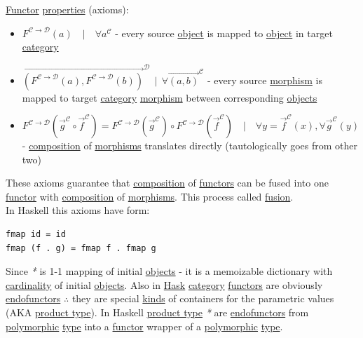\documentclass[a4paper,14pt,oneside]{book}
\begin{document}
\hyperref[orge5e236e]{Functor} \hyperref[org1feb373]{properties} (axioms):\\
\begin{itemize}
\item \(F^{\mathcal{C \to D}}(a) \quad | \quad \forall a^{\mathcal{C}}\) - every source \hyperref[org5771609]{object} is mapped to \hyperref[org5771609]{object} in target \hyperref[org841d8bc]{category}\\
\item \(\overrightarrow{(F^{\mathcal{C \to D}}(a),F^{\mathcal{C \to D}}(b))}^{\mathcal{D}} \ \ | \ \ \forall \overrightarrow{(a, b)}^{\mathcal{C}}\) - every source \hyperref[org2170e98]{morphism} is mapped to target \hyperref[org841d8bc]{category} \hyperref[org2170e98]{morphism} between corresponding \hyperref[org22f7883]{objects}\\
\item \(F^{\mathcal{C \to D}}(\overrightarrow{g}^{\mathcal{C}} \circ \overrightarrow{f}^{\mathcal{C}}) = F^{\mathcal{C \to D}}(\overrightarrow{g}^{\mathcal{C}}) \circ F^{\mathcal{C \to D}}(\overrightarrow{f}^{\mathcal{C}}) \quad | \quad \forall y=\overrightarrow{f}^{\mathcal{C}}(x), \forall \overrightarrow{g}^{\mathcal{C}}(y)\) - \hyperref[orgb060001]{composition} of \hyperref[org9d6b2ec]{morphisms} translates directly (tautologically goes from other two)\\
\end{itemize}

These axioms guarantee that \hyperref[orgb060001]{composition} of \hyperref[orgcde2498]{functors} can be fused into one \hyperref[orge5e236e]{functor} with \hyperref[orgb060001]{composition} of \hyperref[org9d6b2ec]{morphisms}. This process called \hyperref[orgb479933]{fusion}.\\

In Haskell this axioms have form:\\
\begin{verbatim}
fmap id = id
fmap (f . g) = fmap f . fmap g
\end{verbatim}

Since \emph{*} is 1-1 mapping of initial \hyperref[org22f7883]{objects} - it is a memoizable dictionary with \hyperref[org1b54c0c]{cardinality} of initial \hyperref[org22f7883]{objects}. Also in \hyperref[orgb78470d]{Hask} \hyperref[org841d8bc]{category} \hyperref[orgcde2498]{functors} are obviously \hyperref[orgae43c73]{endofunctors} \(\therefore\) they are special \hyperref[org73f8c0d]{kinds} of containers for the parametric values (AKA \hyperref[org4a796bd]{product type}). In Haskell \hyperref[org4a796bd]{product type} \emph{*} are \hyperref[orgae43c73]{endofunctors} from \hyperref[org0255a02]{polymorphic} \hyperref[orgd6db20c]{type} into a \hyperref[orge5e236e]{functor} wrapper of a \hyperref[org0255a02]{polymorphic} \hyperref[orgd6db20c]{type}.\\
\end{document}
